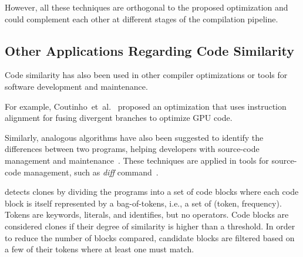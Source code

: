 However, all these techniques are orthogonal to the proposed optimization and
could complement each other at different stages of the compilation pipeline.

\subsection{Other Applications Regarding Code Similarity}

Code similarity has also been used in other compiler optimizations or tools for
software development and maintenance.

For example, Coutinho~et~al.~\cite{coutinho11} proposed an optimization that uses
instruction alignment for fusing divergent branches to optimize GPU code.

Similarly, analogous algorithms have also been suggested to identify the
differences between two programs, helping developers with source-code
management and maintenance~\cite{yang91,miller85}.
These techniques are applied in tools for source-code management, such as
\textit{diff} command~\cite{miller85}.

\cite{sajnani16} detects clones by dividing the programs into a set of
code blocks where each code block is itself represented by a bag-of-tokens, i.e.,
a set of (token, frequency).
Tokens are keywords, literals, and identifies, but no operators.
Code blocks are considered clones if their degree of similarity is higher than
a threshold.
In order to reduce the number of blocks compared, candidate blocks are filtered
based on a few of their tokens where at least one must match.





